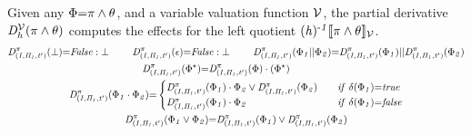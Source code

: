 \documentclass[acmsmall,10pt,review]{acmart}
\newcommand{\env}{\code{\mathcal{V}}}
\newcommand{\es}{\theta}
\newcommand{\timedEffects}{\emph{TimEffs}}
\newcommand{\effect}{\textcolor{black}{\ensuremath{\mathrm{\Phi}}}}
\newcommand{\seq}{\cdot}
\newcommand{\choice}{\vee}
\newcommand{\code}[1]{{\tt{\ensuremath{\m{#1}}}}}
\newcommand{\empt}{\textcolor{black}{\ensuremath{\epsilon}}}
\newcommand{\bott}{\textcolor{black}{\ensuremath{\bot}}}
\newcommand{\m}{\mathit}
\begin{document}
{\begin{definition}[Partial Derivative\footnote{Intuitively, the partial derivative refers to the left quotient of a language equation, for example, for REs, \code{x^{{-}1} \llbracket x\cdot y\rrbracket {=} y};  \code{y^{{-}1} \llbracket x\cdot y\rrbracket {=} \bott}; and  \code{y^{{-}1} \llbracket x + y\rrbracket {=} \epsilon}. Here we come up with a new notion of partial derivative for \timedEffects. 
}]\label{Derivative}
Given any \code{\effect {=} \pi \wedge \es}, and a variable valuation function \code{\env}, 
the partial derivative \code{D^{\env}_{h}(\pi \wedge \es)} 
 computes the  effects for the 
left quotient \code{(h)^{\text{-}1}\llbracket \pi \wedge \es 
\rrbracket_{\env}}. 
\begin{gather*}
\code{D^{\pi}_{(I, \Pi_1, t^\prime)}(\bott) {=}}  
 \code{False : \bott} 
\qquad\ 
\code{D^{\pi}_{(I, \Pi_1, t^\prime)}(  \empt) {=}}   
\code{False : \bott} 
\qquad \ 
\code{D^{\pi}_{(I, \Pi_1, t^\prime)}(\effect_1 ||\effect_2)} {=} \code{D^{\pi}_{(I, \Pi_1, t^\prime)}(\effect_1)} || \code{D^{\pi}_{(I, \Pi_1, t^\prime)}(\effect_2)} 
    \\
        \code{D^{\pi}_{(I, \Pi_1, t^\prime)}(  {\effect^\star}) } {=} \code{ D^{\pi}_{(I, \Pi_1, t^\prime)}(  {\effect}) \cdot ({\effect^\star})}  
        \qquad\qquad
\\
{
 \code{D^{\pi}_{(I, \Pi_1, t^\prime)}(   \effect_1 \seq \effect_2) {=} }
\begin{cases}
      \code{D^{\pi}_{(I, \Pi_1, t^\prime)}(   \effect_1) \cdot  \effect_2 \vee  D^{\pi}_{(I, \Pi_1, t^\prime)}( \effect_2)} \quad &\code{if\ \delta(\effect_1) {=} true}   \\
      \code{D^{\pi}_{(I, \Pi_1, t^\prime)}  ( \effect_1) \cdot  \effect_2} & \code{if\ \delta(\effect_1) {=} false} 
    \end{cases} 
    }
 \\
\code{D^{\pi}_{(I, \Pi_1, t^\prime)}(  \effect_1 \choice \effect_2) } {=} \code{ D^{\pi}_{(I, \Pi_1, t^\prime)}(  \effect_1) \choice D^{\pi}_{(I, \Pi_1, t^\prime)}(  \effect_2)} 
\\

\end{gather*}
\end{definition}}
\end{document}

